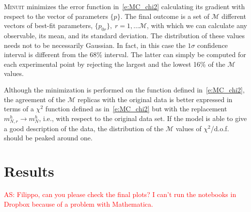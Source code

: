 \documentclass[aps,preprintnumbers,showpacs,nofootinbib,superscriptaddress,floatfix]{revtex4}
\newcommand{\minuit}{\textsc{Minuit }}
\begin{document}
\minuit minimizes the error function in~\eqref{e:MC_chi2} calculating its gradient with respect to the vector of parameters $\{p\}$. 
The final outcome is a set of $\mathcal{M}$ different vectors of best-fit parameters, $\{ p_{0r}\},\; r=1,\ldots \mathcal{M}$, with which we can calculate any observable, its mean, and its standard deviation. 
The distribution of these values needs not to be necessarily Gaussian. In fact, in this case the $1 \sigma$ confidence interval is different from the 68\% interval. 
The latter can simply be computed for each experimental point by rejecting the largest and the lowest 16\% of the $\mathcal{M}$ values.   

Although the minimization is performed on the function defined in~\eqref{e:MC_chi2}, the agreement of the $\mathcal{M}$ replicas with the original data is better expressed in terms of a $\chi^2$ function defined as in~\eqref{e:MC_chi2} but with the replacement $m_{N, r}^{h} \to m_{N}^{h}$, i.e.,  with respect to the original data set. If the model is able to give a good description of the data, the distribution of the $\mathcal{M}$ values of $\chi^2$/d.o.f. should be peaked around one. 














\section{Results}
\label{s:results}

\textcolor{red}{AS: Filippo, can you please check the final plots? I can't run the notebooks in Dropbox because of a problem with Mathematica.}
\end{document}
